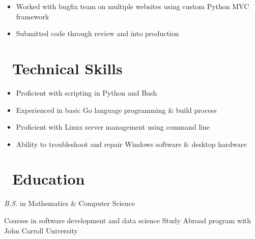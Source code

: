 \documentclass{resume}
\begin{document}
\begin{itemize}
  \item Worked with bugfix team on multiple websites using custom Python MVC framework
  \item Submitted code through review and into production
\end{itemize}

\section{\faCogs\ Technical Skills}
\begin{itemize}[parsep=0.5ex]
  \item Proficient with scripting in Python and Bash
  \item Experienced in basic Go language programming \& build process
  \item Proficient with Linux server management using command line
  \item Ability to troubleshoot and repair Windows software \& desktop hardware
\end{itemize}

\section{\faGraduationCap\ Education}
\textit{B.S.} in Mathematics \& Computer Science
\par Courses in software development and data science
Study Abroad program with John Carroll University
\end{document}
